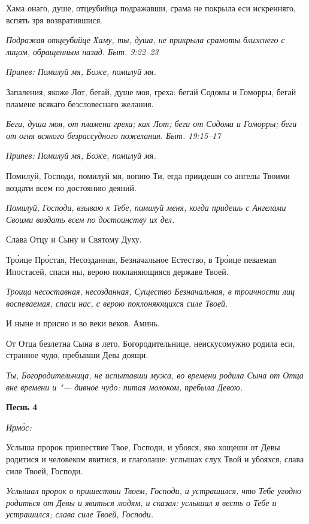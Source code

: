 Хама онаго, душе, отцеубийца подражавши, срама не покрыла еси искренняго, вспять зря возвратившися.


\itshape Подражая отцеубийце Хаму, ты, душа, не прикрыла срамоты ближнего с лицом, обращенным назад. Быт. 9:22–23\normalfont{}


\itshape Припев:\normalfont{} Помилуй мя, Боже, помилуй мя.


Запаления, якоже Лот, бегай, душе моя, греха: бегай Содомы и Гоморры, бегай пламене всякаго безсловеснаго желания.


\itshape Беги, душа моя, от пламени греха; как Лот; беги от Содома и Гоморры; беги от огня всякого безрассудного пожелания. Быт. 19:15–17\normalfont{}


\itshape Припев:\normalfont{} Помилуй мя, Боже, помилуй мя.


Помилуй, Господи, помилуй мя, вопию Ти, егда приидеши со ангелы Твоими воздати всем по достоянию деяний.


\itshape Помилуй, Господи, взываю к Тебе, помилуй меня, когда придешь с Ангелами Своими воздать всем по достоинству их дел.\normalfont{}


Слава Отцу и Сыну и Святому Духу.


Тро́ице Про́стая, Несозданная, Безначальное Естество, в Тро́ице певаемая Ипостасей, спаси ны, верою покланяющияся державе Твоей.


\itshape Троица несоставная, несозданная, Существо Безначальная, в троичности лиц воспеваемая, спаси нас, с верою поклоняющихся силе Твоей.\normalfont{}


И ныне и присно и во веки веков. Аминь.


От Отца безлетна Сына в лето, Богородительнице, неискусомужно родила еси, странное чудо, пребывши Дева доящи.


\itshape Ты, Богородительница, не испытавши мужа, во времени родила Сына от Отца вне времени и "--- дивное чудо: питая молоком, пребыла Девою.\normalfont{}





\bfseries Песнь 4\normalfont{}


\itshape Ирмо́с:\normalfont{}


Услыша пророк пришествие Твое, Господи, и убояся, яко хощеши от Девы родитися и человеком явитися, и глаголаше: услышах слух Твой и убояхся, слава силе Твоей, Господи.


\itshape Услышал пророк о пришествии Твоем, Господи, и устрашился, что Тебе угодно родиться от Девы и явиться людям, и сказал: услышал я весть о Тебе и устрашился; слава силе Твоей, Господи.\normalfont{}


